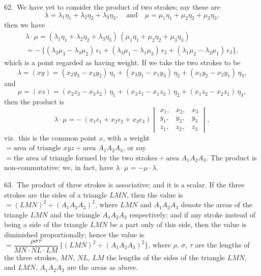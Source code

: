 \documentclass[11pt,a4paper]{book}
\begin{document}
62.\ We have yet to consider the product of two strokes; say these are
\[
\lambda = \lambda_1 \eta_1 + \lambda_2 \eta_2 + \lambda_3 \eta_3, \quad \text{and} \quad
\mu = \mu_1 \eta_1 + \mu_2 \eta_2 + \mu_3 \eta_3,
\]
then we have
\begin{multline*}
\lambda \cdot \mu
= (\lambda_1 \eta_1 + \lambda_2 \eta_2 + \lambda_3 \eta_3)\,
(\mu_1 \eta_1 + \mu_2 \eta_2 + \mu_3 \eta_3)\\
= -\, \{(\lambda_2 \mu_3 - \lambda_3 \mu_2)\, \epsilon_1
+ (\lambda_3 \mu_1 - \lambda_1 \mu_3)\, \epsilon_2
+ (\lambda_1 \mu_2 - \lambda_2 \mu_1)\, \epsilon_3\},
\end{multline*}
which is a point regarded as having weight. If we take the two strokes to be
\[
\lambda = (xy) = (x_2 y_3 - x_3 y_2)\, \eta_1 + (x_3 y_1 - x_1 y_3)\, \eta_2 + (x_1 y_2 - x_2 y_1)\, \eta_3,
\]
and
\[
\mu = (xz) = (x_2 z_3 - x_3 z_2)\, \eta_1 + (x_3 z_1 - x_1 z_3)\, \eta_2 + (x_1 z_2 - x_2 z_1)\, \eta_3,
\]
then the product is
\[
\lambda \cdot \mu = -\, (x_1 \epsilon_1 + x_2 \epsilon_2 + x_3 \epsilon_3)
\begin{vmatrix}
x_1, & x_2, & x_3 \\
y_1, & y_2, & y_3 \\
z_1, & z_2, & z_3
\end{vmatrix},
\]
viz.\ this is the common point $x$, with a weight $= \text{area of triangle } xyz \div \text{area } A_1 A_2 A_3$,
or say $= \text{the area of triangle formed by the two strokes} \div \text{area } A_1 A_2 A_3$.
The product is non-commutative: we, in fact, have $\lambda \cdot \mu = -\mu \cdot \lambda$.

63.\ The product of three strokes is associative; and it is a scalar. If the three
strokes are the sides of a triangle $LMN$, then the value is $= (LMN)^2 \div (A_1 A_2 A_3)^2$,
where $LMN$ and $A_1 A_2 A_3$ denote the areas of the triangle $LMN$ and the triangle
$A_1 A_2 A_3$ respectively; and if any stroke instead of being a side of the triangle $LMN$
be a part only of this side, then the value is diminished proportionally; hence the value is
$= \dfrac{\rho \sigma \tau}{MN \cdot NL \cdot LM}\, \{(LMN)^2 \div (A_1 A_2 A_3)^2\}$,
where $\rho$, $\sigma$, $\tau$ are the lengths of the three strokes, $MN$, $NL$, $LM$ the lengths
of the sides of the triangle $LMN$, and $LMN$, $A_1 A_2 A_3$ are the areas as above.
\end{document}
